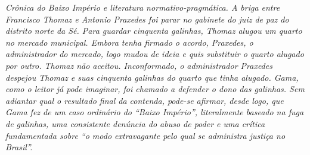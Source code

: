 \begin{didascalia}\itshape
Crônica do Baixo Império e literatura normativo-pragmática. A briga
entre Francisco Thomaz e Antonio Praxedes foi parar no gabinete do juiz
de paz do distrito norte da Sé. Para guardar cinquenta galinhas, Thomaz
alugou um quarto no mercado municipal. Embora tenha firmado o acordo,
Praxedes, o administrador do mercado, logo mudou de ideia e quis
substituir o quarto alugado por outro. Thomaz não aceitou. Inconformado,
o administrador Praxedes despejou Thomaz e suas cinquenta galinhas do
quarto que tinha alugado. Gama, como o leitor já pode imaginar, foi
chamado a defender o dono das galinhas. Sem adiantar qual o resultado
final da contenda, pode-se afirmar, desde logo, que Gama fez de um caso
ordinário do ``Baixo Império'', literalmente baseado na fuga de galinhas,
uma consistente denúncia do abuso de poder e uma crítica fundamentada
sobre ``o modo extravagante pelo qual se administra justiça no Brasil''.
\end{didascalia}


